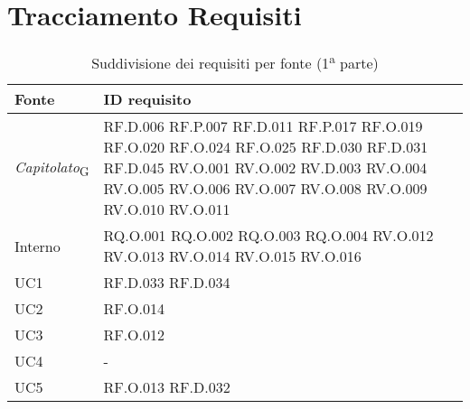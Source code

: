 \section{Tracciamento Requisiti}
\begin{table}[H]
\centering
    \begin{tabular}{|C{3.0cm}|C{3.0cm}|}
        \hline
        \textbf{Fonte} & 
        \textbf{ID requisito} \\
        \hline
        \textit{Capitolato}\textsubscript{G} & 
        RF.D.006 \newline 
        RF.P.007 \newline 
        RF.D.011 \newline 
        RF.P.017 \newline 
        RF.O.019 \newline 
        RF.O.020 \newline 
        RF.O.024 \newline 
        RF.O.025 \newline 
        RF.D.030 \newline 
        RF.D.031 \newline 
        RF.D.045 \newline 
        RV.O.001 \newline 
        RV.O.002 \newline 
        RV.D.003 \newline 
        RV.O.004 \newline 
        RV.O.005 \newline 
        RV.O.006 \newline 
        RV.O.007 \newline 
        RV.O.008 \newline 
        RV.O.009 \newline 
        RV.O.010 \newline 
        RV.O.011 \\
        \hline
        Interno & 
        RQ.O.001 \newline
        RQ.O.002 \newline
        RQ.O.003 \newline
        RQ.O.004 \newline
        RV.O.012 \newline
        RV.O.013 \newline
        RV.O.014 \newline
        RV.O.015 \newline
        RV.O.016 \\
        \hline
        UC1 &
        RF.D.033 \newline
        RF.D.034 \\
        \hline
        UC2 &
        RF.O.014 \\
        \hline
        UC3 &
        RF.O.012 \\
        \hline
        UC4 &
        - \\
        \hline
        UC5 &
        RF.O.013 \newline
        RF.D.032 \\
        \hline
    \end{tabular}
    \caption{Suddivisione dei requisiti per fonte (1\textsuperscript{a} parte)}
\end{table}
